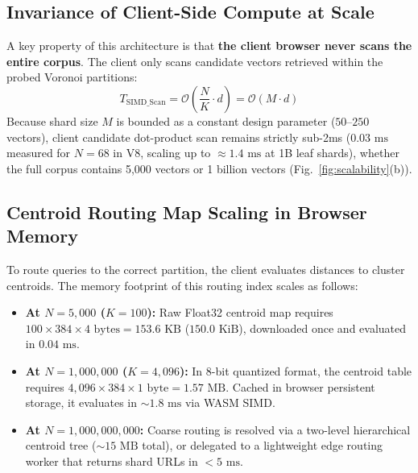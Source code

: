 \documentclass[11pt,journal,compsoc,onecolumn]{IEEEtran}
\begin{document}
\subsection{Invariance of Client-Side Compute at Scale}
A key property of this architecture is that \textbf{the client browser never scans the entire corpus}. The client only scans candidate vectors retrieved within the probed Voronoi partitions:
\begin{equation}
    T_{\text{SIMD\_Scan}} = \mathcal{O}\left( \frac{N}{K} \cdot d \right) = \mathcal{O}(M \cdot d)
\end{equation}
Because shard size $M$ is bounded as a constant design parameter ($50\text{--}250$ vectors), client candidate dot-product scan remains strictly sub-2ms ($0.03\text{ ms}$ measured for $N=68$ in V8, scaling up to $\approx 1.4\text{ ms}$ at 1B leaf shards), whether the full corpus contains 5,000 vectors or 1 billion vectors (Fig.~\ref{fig:scalability}(b)).

\subsection{Centroid Routing Map Scaling in Browser Memory}
To route queries to the correct partition, the client evaluates distances to cluster centroids. The memory footprint of this routing index scales as follows:
\begin{itemize}
    \item \textbf{At $N = 5,000$ ($K = 100$):} Raw Float32 centroid map requires $100 \times 384 \times 4\text{ bytes} = 153.6\text{ KB}$ ($150.0\text{ KiB}$), downloaded once and evaluated in $0.04\text{ ms}$.
    \item \textbf{At $N = 1,000,000$ ($K = 4,096$):} In 8-bit quantized format, the centroid table requires $4,096 \times 384 \times 1\text{ byte} = 1.57\text{ MB}$. Cached in browser persistent storage, it evaluates in $\sim 1.8\text{ ms}$ via WASM SIMD.
    \item \textbf{At $N = 1,000,000,000$:} Coarse routing is resolved via a two-level hierarchical centroid tree ($\sim 15\text{ MB}$ total), or delegated to a lightweight edge routing worker that returns shard URLs in $<5\text{ ms}$.
\end{itemize}
\end{document}
